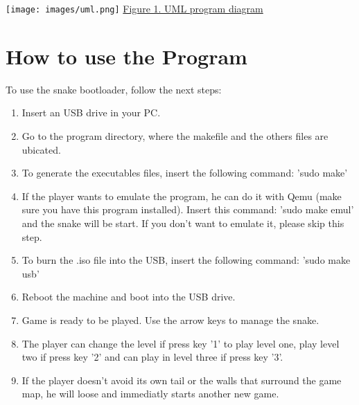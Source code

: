 \documentclass[11pt]{book}
\begin{document}
\begin{center}
    \texttt{[image: images/uml.png]} 
    \newline
\underline{Figure 1. UML program diagram}

\end{center}







\newpage
\section*{How to use the Program}
To use the snake bootloader, follow the next steps:
\begin{enumerate}
    \item {Insert an USB drive in your PC.}
    \item {Go to the program directory, where the makefile and the others files are ubicated.}
    \item {To generate the executables files, insert the following command: 'sudo make'}
    \item{If the player wants to emulate the program, he can do it with Qemu (make sure you have this program installed). Insert this command: 'sudo make emul' and the snake will be start. If you don't want to emulate it, please skip this step.}
    \item{To burn the .iso file into the USB, insert the following command: 'sudo make usb'}
    \item {Reboot the machine and boot into the USB drive.}
    \item{Game is ready to be played. Use the arrow keys to manage the snake.}
    \item{The player can change the level if press key '1' to play level one, play level two if press key '2' and can play in level three if press key '3'.}
    \item{If the player doesn't avoid its own tail or the walls that surround the game map, he will loose and immediatly starts another new game.}
\end{enumerate}



\end{document}
